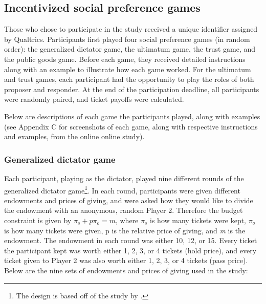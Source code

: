 \documentclass[12pt]{article}
\begin{document}
\subsection{Incentivized social preference games}

Those who chose to participate in the study received a unique identifier assigned by Qualtrics. Participants first played four social preference games (in random order): the generalized dictator game, the ultimatum game, the trust game, and the public goods game. Before each game, they received detailed instructions along with an example to illustrate how each game worked. For the ultimatum and trust games, each participant had the opportunity to play the roles of both proposer and responder. At the end of the participation deadline, all participants were randomly paired, and ticket payoffs were calculated.

Below are descriptions of each game the participants played, along with examples (see Appendix C for screenshots of each game, along with respective instructions and examples, from the online online study).

\subsubsection{Generalized dictator game}

Each participant, playing as the dictator, played nine different rounds of the generalized dictator game\footnote{The design is based off of the study by \cite{andreoni_miller_2002}.}. In each round, participants were given different endowments and prices of giving, and were asked how they would like to divide the endowment with an anonymous, random Player 2. Therefore the budget constraint is given by \(\pi_{s} + p\pi_{o} = \textit{m}\), where \(\pi_{s}\) is how many tickets were kept, \(\pi_{o}\) is how many tickets were given, p is the relative price of giving, and \textit{m} is the endowment. The endowment in each round was either 10, 12, or 15. Every ticket the participant kept was worth either 1, 2, 3, or 4 tickets (hold price), and every ticket given to Player 2 was also worth either 1, 2, 3, or 4 tickets (pass price). Below are the nine sets of endowments and prices of giving used in the study:
\end{document}
